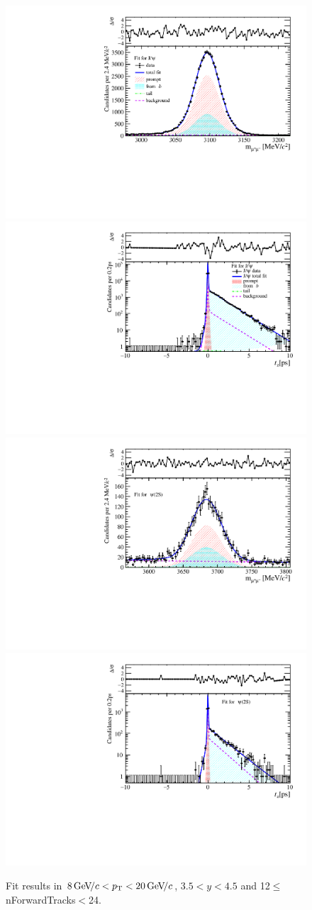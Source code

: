 \begin{figure}[H]
\begin{center}
\includegraphics[width=0.47\linewidth]{pdf/Jpsi/drawmassF/n2y3pt5.pdf}
\includegraphics[width=0.47\linewidth]{pdf/Jpsi/2DFitF/n2y3pt5.pdf}
\vspace*{-0.5cm}
\includegraphics[width=0.47\linewidth]{pdf/Psi2S/drawmassF/n2y3pt5.pdf}
\includegraphics[width=0.47\linewidth]{pdf/Psi2S/2DFitF/n2y3pt5.pdf}
\vspace*{-0.5cm}
\end{center}
\caption{Fit results in $8\text{\,Ge\kern -0.1em V\!/}c<p_{\mathrm{T}}<20\text{\,Ge\kern -0.1em V\!/}c$, $3.5<y<4.5$ and 12$\leq$nForwardTracks$<$24.}
\label{Fitn2y3pt5}
\end{figure}
